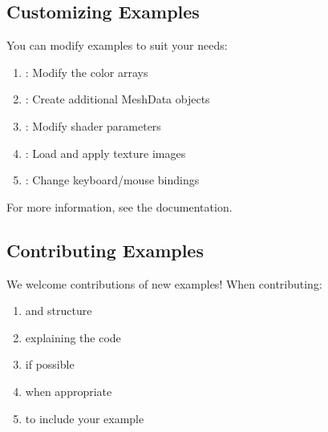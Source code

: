 \documentclass[a4paper,10pt,english,openany,oneside]{sphinxmanual}
\begin{document}
\subsection{Customizing Examples}
\label{\detokenize{examples:customizing-examples}}
\sphinxAtStartPar
You can modify examples to suit your needs:
\begin{enumerate}
%
\item {} 
\sphinxAtStartPar
{}: Modify the color arrays

\item {} 
\sphinxAtStartPar
{}: Create additional MeshData objects

\item {} 
\sphinxAtStartPar
{}: Modify shader parameters

\item {} 
\sphinxAtStartPar
{}: Load and apply texture images

\item {} 
\sphinxAtStartPar
{}: Change keyboard/mouse bindings

\end{enumerate}

\sphinxAtStartPar
For more information, see the {\hyperref[\detokenize{api/renderer::doc}]{}} documentation.


\subsection{Contributing Examples}
\label{\detokenize{examples:contributing-examples}}
\sphinxAtStartPar
We welcome contributions of new examples! When contributing:
\begin{enumerate}
%
\item {} 
\sphinxAtStartPar
{} and structure

\item {} 
\sphinxAtStartPar
{} explaining the code

\item {} 
\sphinxAtStartPar
{} if possible

\item {} 
\sphinxAtStartPar
{} when appropriate

\item {} 
\sphinxAtStartPar
{} to include your example

\end{enumerate}
\end{document}
